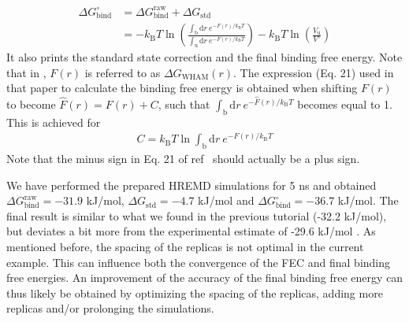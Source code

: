 \begin{equation}
  \begin{aligned}
    \Delta G_{\text{bind}}^{\circ} & = \Delta G_{\text{bind}}^{\text{raw}} + \Delta G_{\text{std}}  \\
                            & = -k_{\text{B}} T \ln \left ( \frac{\int_{\text{b}} \mathrm{d}r\: e^{-F(r)/k_{\text{B}} T}}{\int_{\text{u}} \mathrm{d}r\: e^{-F(r)/k_{\text{B}} T}} \right ) -k_{\text{B}} T \ln \left( \frac{V_{\text{u}}}{V^{\circ}} \right )
  \end{aligned}
\end{equation}
%
It also prints the standard state correction and the final binding free energy. 
Note that in \cite{deRuiter_2013}, $F(r)$ is referred to as $\Delta G_{\text{WHAM}}(r)$. The expression (Eq. 21) used in that paper to calculate the binding free energy is obtained when shifting $F(r)$ to become $\hat{F}(r) = F(r) + C$, such that $\int_{\text{b}} \mathrm{d}r\: e^{-\hat{F}(r)/k_{\text{B}} T}$ becomes equal to 1. This is achieved for 
\begin{equation}
  \begin{aligned}
    C = k_{\text{B}}T \ln \int_{\text{b}} \mathrm{d}r\: e^{-F(r)/k_{\text{B}} T}
  \end{aligned}
\end{equation}
Note that the minus sign in Eq. 21 of ref~\cite{deRuiter_2013} should actually be a plus sign.

We have performed the prepared HREMD simulations for 5 ns and obtained $\Delta G^{\text{raw}}_{\text{bind}}=-31.9$ kJ/mol, $\Delta G_{\text{std}}=-4.7$ kJ/mol and $\Delta G^{\circ}_{\text{bind}}=-36.7$ kJ/mol. The final result is similar to what we found in the previous tutorial (-32.2 kJ/mol), but deviates a bit more from the experimental estimate of -29.6 kJ/mol \cite{Singh2005}.
As mentioned before, the spacing of the replicas is not optimal in the current example. 
This can influence both the convergence of the FEC and final binding free energies.
An improvement of the accuracy of the final binding free energy can thus likely be obtained by optimizing the spacing of the replicas, adding more replicas and/or prolonging the simulations.
